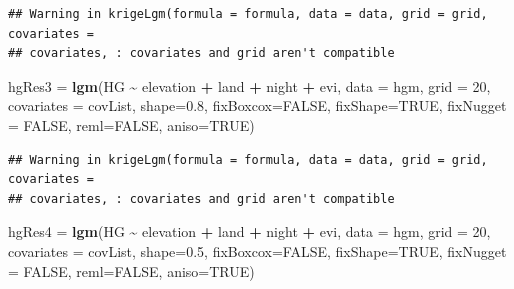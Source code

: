 \documentclass[
]{article}
\newenvironment{Shaded}{\begin{snugshade}}{\end{snugshade}}
\newcommand{\AttributeTok}[1]{\textcolor[rgb]{0.13,0.29,0.53}{#1}}
\newcommand{\ConstantTok}[1]{\textcolor[rgb]{0.56,0.35,0.01}{#1}}
\newcommand{\DecValTok}[1]{\textcolor[rgb]{0.00,0.00,0.81}{#1}}
\newcommand{\FloatTok}[1]{\textcolor[rgb]{0.00,0.00,0.81}{#1}}
\newcommand{\FunctionTok}[1]{\textcolor[rgb]{0.13,0.29,0.53}{\textbf{#1}}}
\newcommand{\NormalTok}[1]{#1}
\newcommand{\OtherTok}[1]{\textcolor[rgb]{0.56,0.35,0.01}{#1}}
\newcommand{\SpecialCharTok}[1]{\textcolor[rgb]{0.81,0.36,0.00}{\textbf{#1}}}
\begin{document}
\begin{verbatim}
## Warning in krigeLgm(formula = formula, data = data, grid = grid, covariates =
## covariates, : covariates and grid aren't compatible
\end{verbatim}

\begin{Shaded}
\begin{Highlighting}[]
\NormalTok{hgRes3 }\OtherTok{=} \FunctionTok{lgm}\NormalTok{(HG }\SpecialCharTok{\textasciitilde{}}\NormalTok{ elevation }\SpecialCharTok{+}\NormalTok{ land }\SpecialCharTok{+}\NormalTok{ night }\SpecialCharTok{+}\NormalTok{ evi, }\AttributeTok{data =}\NormalTok{ hgm,}
             \AttributeTok{grid =} \DecValTok{20}\NormalTok{, }\AttributeTok{covariates =}\NormalTok{ covList, }\AttributeTok{shape=}\FloatTok{0.8}\NormalTok{, }
             \AttributeTok{fixBoxcox=}\ConstantTok{FALSE}\NormalTok{, }\AttributeTok{fixShape=}\ConstantTok{TRUE}\NormalTok{, }\AttributeTok{fixNugget =} \ConstantTok{FALSE}\NormalTok{,  }
             \AttributeTok{reml=}\ConstantTok{FALSE}\NormalTok{, }\AttributeTok{aniso=}\ConstantTok{TRUE}\NormalTok{)}
\end{Highlighting}
\end{Shaded}

\begin{verbatim}
## Warning in krigeLgm(formula = formula, data = data, grid = grid, covariates =
## covariates, : covariates and grid aren't compatible
\end{verbatim}

\begin{Shaded}
\begin{Highlighting}[]
\NormalTok{hgRes4 }\OtherTok{=} \FunctionTok{lgm}\NormalTok{(HG }\SpecialCharTok{\textasciitilde{}}\NormalTok{ elevation }\SpecialCharTok{+}\NormalTok{ land }\SpecialCharTok{+}\NormalTok{ night }\SpecialCharTok{+}\NormalTok{ evi, }\AttributeTok{data =}\NormalTok{ hgm,}
             \AttributeTok{grid =} \DecValTok{20}\NormalTok{, }\AttributeTok{covariates =}\NormalTok{ covList, }\AttributeTok{shape=}\FloatTok{0.5}\NormalTok{, }
             \AttributeTok{fixBoxcox=}\ConstantTok{FALSE}\NormalTok{, }\AttributeTok{fixShape=}\ConstantTok{TRUE}\NormalTok{, }\AttributeTok{fixNugget =} \ConstantTok{FALSE}\NormalTok{,  }
             \AttributeTok{reml=}\ConstantTok{FALSE}\NormalTok{, }\AttributeTok{aniso=}\ConstantTok{TRUE}\NormalTok{)}
\end{Highlighting}
\end{Shaded}
\end{document}
